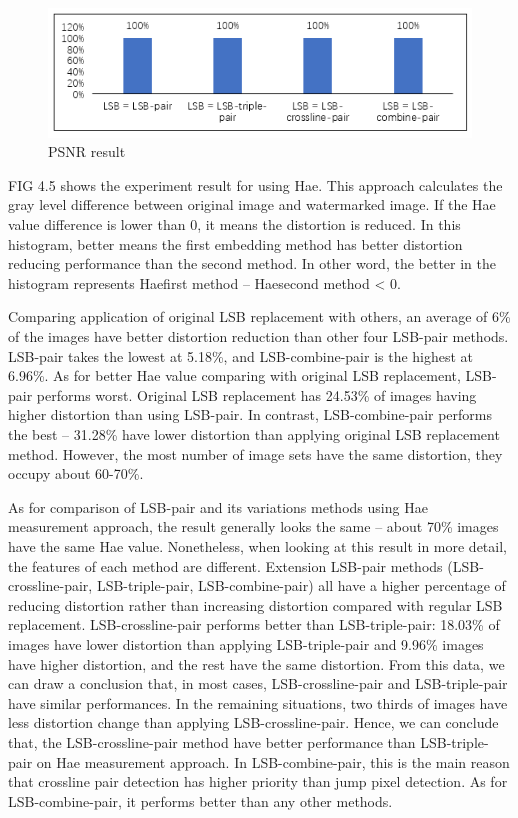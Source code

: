 \begin{figure}[h]
\includegraphics[width=\columnwidth]{image/PSNR.PNG}
\caption{PSNR result}
\label{fig:figure}
\end{figure} 


FIG 4.5  shows the experiment result for using Hae. This approach calculates the gray level difference between original image and watermarked image. If the Hae value difference is lower than 0, it means the distortion is reduced. In this histogram, better means the first embedding method has better distortion reducing performance than the second method. In other word, the better in the histogram represents Haefirst method – Haesecond method < 0.

Comparing application of original LSB replacement with others, an average of 6\% of the images have better distortion reduction than other four LSB-pair methods. LSB-pair takes the lowest at 5.18\%, and LSB-combine-pair is the highest at 6.96\%. As for better Hae value comparing with original LSB replacement, LSB-pair performs worst. Original LSB replacement has 24.53\% of images having higher distortion than using LSB-pair. In contrast, LSB-combine-pair performs the best -- 31.28\% have lower distortion than applying original LSB replacement method. However, the most number of image sets have the same distortion, they occupy about 60-70\%. 

As for comparison of LSB-pair and its variations methods using Hae measurement approach, the result generally looks the same -- about 70\% images have the same Hae value. Nonetheless, when looking at this result in more detail, the features of each method are different. Extension LSB-pair methods (LSB-crossline-pair, LSB-triple-pair, LSB-combine-pair) all have a higher percentage of reducing distortion rather than increasing distortion compared with regular LSB replacement. LSB-crossline-pair performs better than LSB-triple-pair: 18.03\% of images have lower distortion than applying LSB-triple-pair and 9.96\% images have higher distortion, and the rest have the same distortion. 
From this data, we can draw a conclusion that, in most cases, LSB-crossline-pair and LSB-triple-pair have similar performances. In the remaining situations, two thirds of images have less distortion change than applying LSB-crossline-pair. Hence, we can conclude that, the LSB-crossline-pair method have better performance than LSB-triple-pair on Hae measurement approach. In LSB-combine-pair, this is the main reason that crossline pair detection has higher priority than jump pixel detection. As for LSB-combine-pair, it performs better than any other methods.

